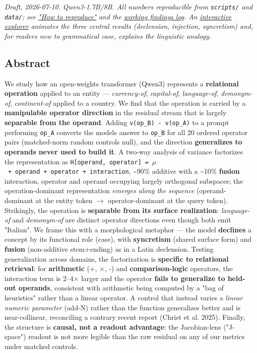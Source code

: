 \emph{Draft, 2026-07-10. Qwen3-1.7B/8B. All numbers reproducible from
\texttt{scripts/} and \texttt{data/}; see \href{reproduce.md}{"How to
reproduce"} and the \href{findings.md}{working findings log}. An
\href{explorer.md}{interactive explorer} animates the three central
results (declension, injection, syncretism) and, for readers new to
grammatical case, explains the linguistic analogy.}

\subsection{Abstract}\label{abstract}

We study how an open-weights transformer (Qwen3) represents a
\textbf{relational operation} applied to an entity ---
\emph{currency-of}, \emph{capital-of}, \emph{language-of},
\emph{demonym-of}, \emph{continent-of} applied to a country. We find
that the operation is carried by a \textbf{manipulable operator
direction} in the residual stream that is largely \textbf{separable from
the operand}. Adding \texttt{v(op\_B)\ -\ v(op\_A)} to a prompt
performing \texttt{op\_A} converts the model\textquotesingle s answer to
\texttt{op\_B} for all 20 ordered operator pairs (matched-norm random
controls null), and the direction \textbf{generalizes to operands never
used to build it}. A two-way analysis of variance factorizes the
representation as
\texttt{H{[}operand,\ operator{]}\ =\ \ensuremath{\mu}\ +\ operand\ +\ operator\ +\ interaction},
\textasciitilde90\% additive with a \textasciitilde10\% \textbf{fusion}
interaction, operator and operand occupying largely orthogonal
subspaces; the operation-dominant representation \emph{emerges along the
sequence} (operand-dominant at the entity token \ensuremath{\to} operator-dominant at
the query token). Strikingly, the operation is \textbf{separable from
its surface realization}: \emph{language-of} and \emph{demonym-of} are
distinct operator directions even though both emit "Italian". We frame
this with a morphological metaphor --- the model \textbf{declines} a
concept by its functional role (case), with \textbf{syncretism} (shared
surface form) and \textbf{fusion} (non-additive stem+ending) as in a
Latin declension. Testing generalization across domains, the
factorization is \textbf{specific to relational retrieval}: for
\textbf{arithmetic} (+, \ensuremath{\times}, -) and \textbf{comparison-logic} operators,
the interaction term is 2--4\ensuremath{\times} larger and the operator \textbf{fails to
generalize to held-out operands}, consistent with arithmetic being
computed by a "bag of heuristics" rather than a linear operator. A
control that instead varies a \emph{linear numeric parameter} (add-N)
rather than the function generalizes better and is near-collinear,
reconciling a contrary recent report (Christ et al. 2025). Finally, the
structure is \textbf{causal, not a readout advantage}: the Jacobian-lens
("J-space") readout is not more legible than the raw residual on any of
our metrics under matched controls.

